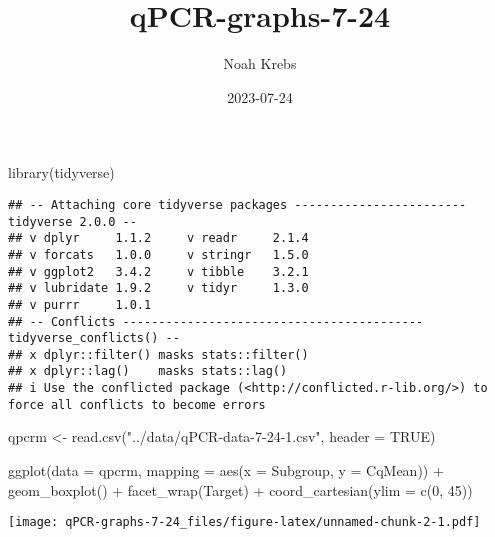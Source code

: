 \documentclass[
]{article}
\title{qPCR-graphs-7-24}
\author{Noah Krebs}
\date{2023-07-24}
\newenvironment{Shaded}{\begin{snugshade}}{\end{snugshade}}
\newcommand{\AttributeTok}[1]{\textcolor[rgb]{0.77,0.63,0.00}{#1}}
\newcommand{\ConstantTok}[1]{\textcolor[rgb]{0.00,0.00,0.00}{#1}}
\newcommand{\DecValTok}[1]{\textcolor[rgb]{0.00,0.00,0.81}{#1}}
\newcommand{\FunctionTok}[1]{\textcolor[rgb]{0.00,0.00,0.00}{#1}}
\newcommand{\NormalTok}[1]{#1}
\newcommand{\OtherTok}[1]{\textcolor[rgb]{0.56,0.35,0.01}{#1}}
\newcommand{\SpecialCharTok}[1]{\textcolor[rgb]{0.00,0.00,0.00}{#1}}
\newcommand{\StringTok}[1]{\textcolor[rgb]{0.31,0.60,0.02}{#1}}
\begin{document}
\maketitle

\begin{Shaded}
\begin{Highlighting}[]
\FunctionTok{library}\NormalTok{(tidyverse)}
\end{Highlighting}
\end{Shaded}

\begin{verbatim}
## -- Attaching core tidyverse packages ------------------------ tidyverse 2.0.0 --
## v dplyr     1.1.2     v readr     2.1.4
## v forcats   1.0.0     v stringr   1.5.0
## v ggplot2   3.4.2     v tibble    3.2.1
## v lubridate 1.9.2     v tidyr     1.3.0
## v purrr     1.0.1     
## -- Conflicts ------------------------------------------ tidyverse_conflicts() --
## x dplyr::filter() masks stats::filter()
## x dplyr::lag()    masks stats::lag()
## i Use the conflicted package (<http://conflicted.r-lib.org/>) to force all conflicts to become errors
\end{verbatim}

\begin{Shaded}
\begin{Highlighting}[]
\NormalTok{qpcrm }\OtherTok{\textless{}{-}} \FunctionTok{read.csv}\NormalTok{(}\StringTok{"../data/qPCR{-}data{-}7{-}24{-}1.csv"}\NormalTok{, }\AttributeTok{header =} \ConstantTok{TRUE}\NormalTok{)}
\end{Highlighting}
\end{Shaded}

\begin{Shaded}
\begin{Highlighting}[]
\FunctionTok{ggplot}\NormalTok{(}\AttributeTok{data =}\NormalTok{ qpcrm, }\AttributeTok{mapping =} \FunctionTok{aes}\NormalTok{(}\AttributeTok{x =}\NormalTok{ Subgroup, }\AttributeTok{y =}\NormalTok{ CqMean)) }\SpecialCharTok{+}   \FunctionTok{geom\_boxplot}\NormalTok{() }\SpecialCharTok{+}
  \FunctionTok{facet\_wrap}\NormalTok{(}\StringTok{\textquotesingle{}Target\textquotesingle{}}\NormalTok{) }\SpecialCharTok{+}
  \FunctionTok{coord\_cartesian}\NormalTok{(}\AttributeTok{ylim =} \FunctionTok{c}\NormalTok{(}\DecValTok{0}\NormalTok{, }\DecValTok{45}\NormalTok{))}
\end{Highlighting}
\end{Shaded}

\texttt{[image: qPCR-graphs-7-24\_files/figure-latex/unnamed-chunk-2-1.pdf]}
\end{document}
